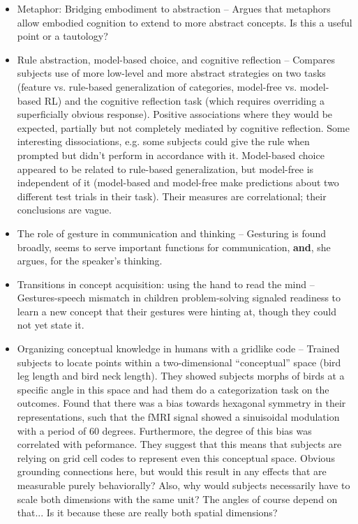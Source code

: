 \documentclass[10pt]{article}
\begin{document}
\begin{itemize}
\item Metaphor: Bridging embodiment to abstraction -- Argues that metaphors allow embodied cognition to extend to more abstract concepts. Is this a useful point or a tautology? 
\item Rule abstraction, model-based choice, and cognitive reflection -- Compares subjects use of more low-level and more abstract strategies on two tasks (feature vs. rule-based generalization of categories, model-free vs. model-based RL) and the cognitive reflection task (which requires overriding a superficially obvious response). Positive associations where they would be expected, partially but not completely mediated by cognitive reflection. Some interesting dissociations, e.g. some subjects could give the rule when prompted but didn't perform in accordance with it. Model-based choice appeared to be related to rule-based generalization, but model-free is independent of it (model-based and model-free make predictions about two different test trials in their task). Their measures are correlational; their conclusions are vague. 
\item The role of gesture in communication and thinking -- Gesturing is found broadly, seems to serve important functions for communication, \textbf{and}, she argues, for the speaker's thinking. \citet{Goldin-Meadow1999}
\item Transitions in concept acquisition: using the hand to read the mind -- Gestures-speech mismatch in children problem-solving signaled readiness to learn a new concept that their gestures were hinting at, though they could not yet state it.
\item Organizing conceptual knowledge in humans with a gridlike code -- Trained subjects to locate points within a two-dimensional ``conceptual'' space (bird leg length and bird neck length). They showed subjects morphs of birds at a specific angle in this space and had them do a categorization task on the outcomes. Found that there was a bias towards hexagonal symmetry in their representations, such that the fMRI signal showed a sinuisoidal modulation with a period of 60 degrees. Furthermore, the degree of this bias was correlated with peformance. They suggest that this means that subjects are relying on grid cell codes to represent even this conceptual space. Obvious grounding connections here, but would this result in any effects that are measurable purely behaviorally? Also, why would subjects necessarily have to scale both dimensions with the same unit? The angles of course depend on that... Is it because these are really both spatial dimensions? \citep{Constantinescu2016}\par

\end{itemize}
\end{document}
